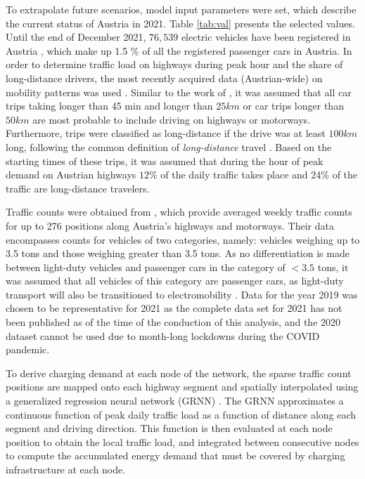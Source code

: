     To extrapolate future scenarios, model input parameters were set, which describe the current status of Austria in 2021. Table \ref{tab:val} presents the selected values. Until the end of December 2021, $76,539$ electric vehicles have been registered in Austria \citep{beoe}, which make up 1.5 \% of all the registered passenger cars in Austria. In order to determine traffic load on highways during peak hour and the share of long-distance drivers, the most recently acquired data (Austrian-wide) on mobility patterns was used \citep{mob_survey}. Similar to the work of \citet{Jochem2016}, it was assumed that all car trips taking longer than 45 min and longer than $25km$ or car trips longer than $50km$ are most probable to include driving on highways or motorways. Furthermore, trips were classified as long-distance if the drive was at least $100km$ long, following the common definition of \textit{long-distance} travel \citep{frei2010long}. Based on the starting times of these trips, it was assumed that during the hour of peak demand on Austrian highways $12\%$ of the daily traffic takes place and 24\% of the traffic are long-distance travelers. 
    
    Traffic counts were obtained from \citet{asfinag}, which provide averaged weekly traffic counts for up to 276 positions along Austria's highways and motorways. Their data encompasses counts for vehicles of two categories, namely: vehicles weighing up to 3.5 tons and those weighing greater than 3.5 tons. As no differentiation is made between light-duty vehicles and passenger cars in the category of $< 3.5$ tons, it was assumed that all vehicles of this category are passenger cars, as light-duty transport will also be transitioned to electromobility \citep{Nachhaltig}. Data for the year 2019 was chosen to be representative for 2021 as the complete data set for 2021 has not been published as of the time of the conduction of this analysis, and the 2020 dataset cannot be used due to  month-long lockdowns during the COVID pandemic. 
    
  To derive charging demand at each node of the network, the sparse traffic count positions are mapped onto each highway segment and spatially interpolated using a generalized regression neural network (GRNN) \citep{Gholamrezaei2007}. The GRNN approximates a continuous function of peak daily traffic load as a function of distance along each segment and driving direction. This function is then evaluated at each node position to obtain the local traffic load, and integrated between consecutive nodes to compute the accumulated energy demand that must be covered by charging infrastructure at each node.

